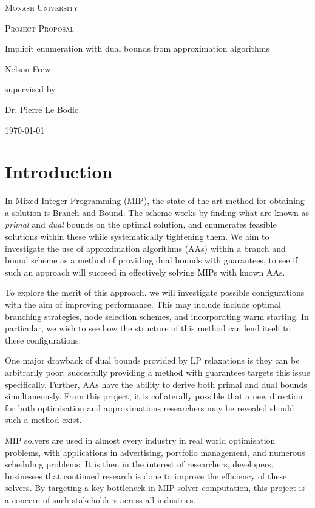 \documentclass[12pt, a4paper]{article}
\begin{document}
\begin{titlepage}
  \centering
  {\scshape\LARGE Monash University \par}
  \vspace{1cm}
  {\scshape\Large Project Proposal \par}
  \vspace{1.5cm}
  {\huge Implicit enumeration with dual bounds from approximation algorithms\par}
  \vspace{2cm}
  {\Large Nelson Frew\par}
  \vfill
  supervised by\par
  Dr. Pierre Le Bodic
  \vfill
  {\large \today\par}
\end{titlepage}
\tableofcontents
\newpage
\section{Introduction}
In Mixed Integer Programming (MIP), the state-of-the-art method for obtaining a solution is Branch and Bound. The scheme works by finding what are known as \emph{primal} and \emph{dual} bounds on the optimal solution, and enumerates feasible solutions within these while systematically tightening them. We aim to investigate the use of approximation algorithms (AAs) within a branch and bound scheme as a method of providing dual bounds with guarantees, to see if such an approach will succeed in effectively solving MIPs with known AAs. 

To explore the merit of this approach, we will investigate possible configurations with the aim of improving performance. This may include include optimal branching strategies, node selection schemes, and incorporating warm starting. In particular, we wish to see how the structure of this method can lend itself to these configurations.

One major drawback of dual bounds provided by LP relaxations is they can be arbitrarily poor: succesfully providing a method with guarantees targets this issue specifically. Further, AAs have the ability to derive both primal and dual bounds simultaneously. From this project, it is collaterally possible that a new direction for both optimisation and approximations researchers may be revealed should such a method exist. 

MIP solvers are used in almost every industry in real world optimisation problems, with applications in advertising, portfolio management, and numerous scheduling problems. It is then in the interest of researchers, developers, businesses that continued research is done to improve the efficiency of these solvers. By targeting a key bottleneck in MIP solver computation, this project is a concern of such stakeholders across all industries. 
\end{document}

